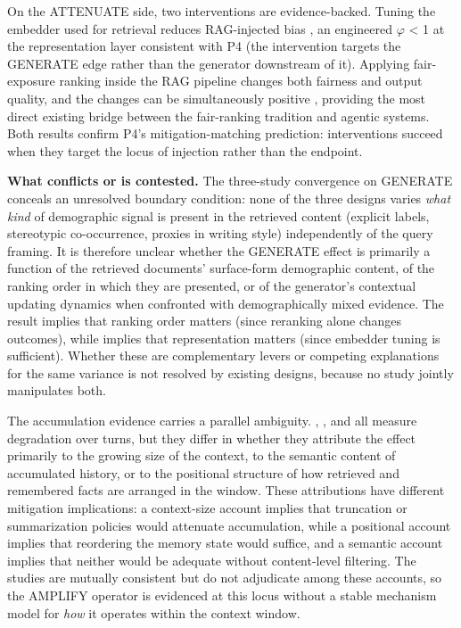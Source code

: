 \documentclass[10pt]{article}
\begin{document}
On the ATTENUATE side, two interventions are evidence-backed. Tuning the embedder used for retrieval reduces RAG-injected bias \cite{kim2025mitigating}, an engineered $\varphi$ < 1 at the representation layer consistent with P4 (the intervention targets the GENERATE edge rather than the generator downstream of it). Applying fair-exposure ranking inside the RAG pipeline changes both fairness and output quality, and the changes can be simultaneously positive \cite{kim2024fair}, providing the most direct existing bridge between the fair-ranking tradition \cite{zehlike2022fairness} and agentic systems. Both results confirm P4's mitigation-matching prediction: interventions succeed when they target the locus of injection rather than the endpoint.

\textbf{What conflicts or is contested.} The three-study convergence on GENERATE conceals an unresolved boundary condition: none of the three designs varies \emph{what kind} of demographic signal is present in the retrieved content (explicit labels, stereotypic co-occurrence, proxies in writing style) independently of the query framing. It is therefore unclear whether the GENERATE effect is primarily a function of the retrieved documents' surface-form demographic content, of the ranking order in which they are presented, or of the generator's contextual updating dynamics when confronted with demographically mixed evidence. The \cite{kim2024fair} result implies that ranking order matters (since reranking alone changes outcomes), while \cite{kim2025mitigating} implies that representation matters (since embedder tuning is sufficient). Whether these are complementary levers or competing explanations for the same variance is not resolved by existing designs, because no study jointly manipulates both.

The accumulation evidence carries a parallel ambiguity. \cite{fan2024fairmt}, \cite{geng2025accumulating}, and \cite{simhi2026old} all measure degradation over turns, but they differ in whether they attribute the effect primarily to the growing size of the context, to the semantic content of accumulated history, or to the positional structure of how retrieved and remembered facts are arranged in the window. These attributions have different mitigation implications: a context-size account implies that truncation or summarization policies would attenuate accumulation, while a positional account implies that reordering the memory state would suffice, and a semantic account implies that neither would be adequate without content-level filtering. The studies are mutually consistent but do not adjudicate among these accounts, so the AMPLIFY operator is evidenced at this locus without a stable mechanism model for \emph{how} it operates within the context window.
\end{document}
